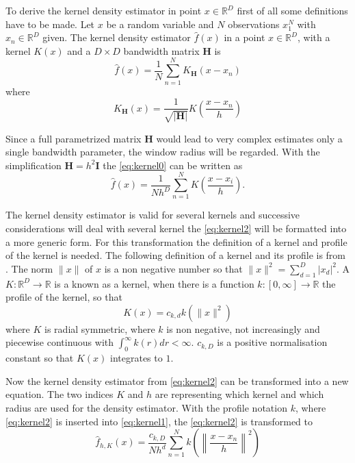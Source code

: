 To derive the kernel density estimator in point $x \in \mathbb{R}^D$
first of all some definitions have to be made. Let $x$ be a random
variable and $N$ observations $x_1^N$ with $x_n \in \mathbb{R}^D$
given. The kernel density estimator $\hat{f}(x)$ in a point $x \in
\mathbb{R}^D$, with a kernel $K(x)$ and a $D \times D$ bandwidth matrix
$\mathbf{H}$ is
\begin{equation}\label{eq:kernel0}
  \hat{f}(x) = \frac{1}{N} \sum_{n = 1}^N K_{\mathbf{H}}\left( x-x_n \right)
\end{equation} 
where
\begin{equation}\label{eq:kernel1}
  K_{\mathbf{H}}(x) = \frac{1}{\sqrt{|\mathbf{H}|}}K \left( \frac{x - x_n}{h} \right)
\end{equation} 

Since a full parametrized matrix $\mathbf{H}$ would lead to very
complex estimates only a single bandwidth parameter, the window radius
will be regarded. With the simplification $\mathbf{H} = h^2
\mathbf{I}$ the \autoref{eq:kernel0} can be written as
\begin{equation}\label{eq:kernel2}
  \hat{f}(x) = \frac{1}{Nh^D}\sum_{n=1}^N K\left( \frac{x - x_i}{h} \right).
\end{equation}

The kernel density estimator is valid for several kernels and
successive considerations will deal with several kernel the
\autoref{eq:kernel2} will be formatted into a more generic form. For
this transformation the definition of a kernel and profile of the
kernel is needed. The following definition of a kernel and its profile
is from \citeauthor{citeulike:2522867} \citep{citeulike:2522867}. The
norm $\lVert x \rVert$ of $x$ is a non negative number so that $\lVert
x \rVert^2 = \sum_{d = 1}^D|x_d|^2$.  A $K:\mathbb{R}^D \rightarrow
\mathbb{R}$ is a known as a kernel, when there is a function $k:[0,
\infty] \rightarrow \mathbb{R}$ the profile of the kernel, so that
\begin{equation}\label{eq:kernel3}
  K(x)=c_{k,d}k(\lVert x \rVert^2)
\end{equation}
where $K$ is radial symmetric, where $k$ is non negative, not
increasingly and piecewise continuous with $\int_0^{\infty} k(r) dr <
\infty$. $c_{k,D}$ is a positive normalisation constant so that $K(x)$
integrates to $1$.

Now the kernel density estimator from \autoref{eq:kernel2} can be
transformed into a new equation. The two indices $K$ and $h$ are
representing which kernel and which radius are used for the density
estimator. With the profile notation $k$, where \autoref{eq:kernel2}
is inserted into \autoref{eq:kernel1}, the \autoref{eq:kernel2} is
transformed to
\begin{equation}\label{eq:kernel4}
  \hat{f}_{h,K}(x) = \frac{c_{k,D}}{Nh^d}
  \sum_{n = 1}^N k\left(\left\lVert \frac{x-x_n}{h} \right\rVert^2\right)
\end{equation}



